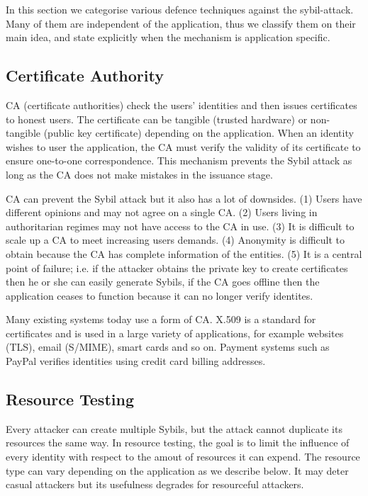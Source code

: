 In this section we categorise various defence techniques against the
sybil-attack. Many of them are independent of the application, thus we classify
them on their main idea, and state explicitly when the mechanism is application
specific.

\subsection{Certificate Authority}\label{sec:cert-authority}

CA (certificate authorities) check the users' identities and then issues
certificates to honest users. The certificate can be tangible (trusted
hardware\cite{newsome2004sybil}) or non-tangible (public key certificate)
depending on the application. When an identity wishes to user the application,
the CA must verify the validity of its certificate to ensure one-to-one
correspondence. This mechanism prevents the Sybil attack as long as the CA does
not make mistakes in the issuance stage.

CA can prevent the Sybil attack but it also has a lot of downsides. (1) Users
have different opinions and may not agree on a single CA. (2) Users living in
authoritarian regimes may not have access to the CA in use. (3) It is difficult
to scale up a CA to meet increasing users demands. (4) Anonymity is difficult to
obtain because the CA has complete information of the entities. (5) It is a
central point of failure; i.e. if the attacker obtains the private key to create
certificates then he or she can easily generate Sybils, if the CA goes offline
then the application ceases to function because it can no longer verify
identites.

Many existing systems today use a form of CA.
X.509 is a standard for certificates and is used in a large variety of
applications, for example websites (TLS), email (S/MIME), smart cards and so on.
Payment systems such as PayPal verifies identities using credit card billing addresses.

\subsection{Resource Testing}
Every attacker can create multiple Sybils, but the attack cannot duplicate its
resources the same way. In resource testing, the goal is to limit the influence
of every identity with respect to the amout of resources it can expend. The
resource type can vary depending on the application as we describe below. It may
deter casual attackers but its usefulness degrades for resourceful attackers.

